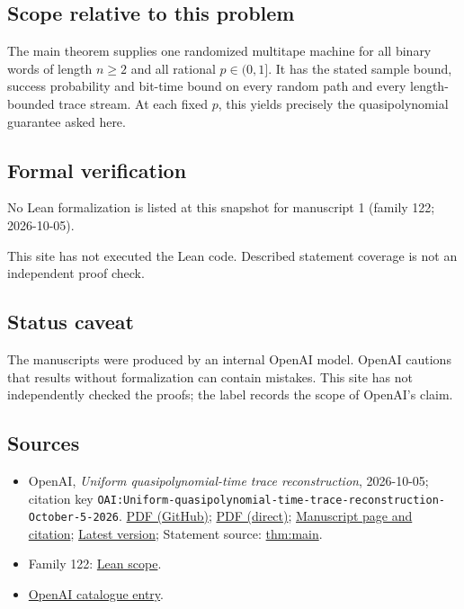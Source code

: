 \documentclass[11pt]{article}
\begin{document}
\subsection{Scope relative to this problem}
The main theorem supplies one randomized multitape machine for all binary words of length $n\ge2$ and all rational $p\in(0,1]$. It has the stated sample bound, success probability and bit-time bound on every random path and every length-bounded trace stream. At each fixed $p$, this yields precisely the quasipolynomial guarantee asked here.

\subsection{Formal verification}
No Lean formalization is listed at this snapshot for manuscript 1 (family 122; 2026-10-05).

This site has not executed the Lean code. Described statement coverage is not an independent proof check.

\subsection{Status caveat}
The manuscripts were produced by an internal OpenAI model. OpenAI cautions that results without formalization can contain mistakes. This site has not independently checked the proofs; the label records the scope of OpenAI's claim.

\subsection{Sources}
\begin{itemize}
\item OpenAI, \emph{Uniform quasipolynomial-time trace reconstruction}, 2026-10-05; citation key \texttt{OAI:Uniform-quasipolynomial-time-trace-reconstruction-October-5-2026}. \href{https://github.com/openai/math/blob/adc7f1241b42e322a6451854ab7e4b4c146bf78a/preprints/Uniform-quasipolynomial-time-trace-reconstruction-October-5-2026/uniform-trace-reconstruction.pdf}{PDF (GitHub)}; \href{https://github.com/openai/math/raw/adc7f1241b42e322a6451854ab7e4b4c146bf78a/preprints/Uniform-quasipolynomial-time-trace-reconstruction-October-5-2026/uniform-trace-reconstruction.pdf}{PDF (direct)}; \href{https://github.com/openai/math/blob/adc7f1241b42e322a6451854ab7e4b4c146bf78a/preprints/Uniform-quasipolynomial-time-trace-reconstruction-October-5-2026/README.md}{Manuscript page and citation}; \href{https://github.com/openai/math/blob/main/preprints/Uniform-quasipolynomial-time-trace-reconstruction-October-5-2026/uniform-trace-reconstruction.pdf}{Latest version}; Statement source: \href{https://github.com/openai/math/blob/adc7f1241b42e322a6451854ab7e4b4c146bf78a/preprints/Uniform-quasipolynomial-time-trace-reconstruction-October-5-2026/build/manuscript/main.tex\#L78}{thm:main}.
\item Family 122: \href{https://github.com/openai/math/blob/adc7f1241b42e322a6451854ab7e4b4c146bf78a/lean/docs/122.md}{Lean scope}.
\item \href{https://github.com/openai/math/blob/adc7f1241b42e322a6451854ab7e4b4c146bf78a/CONTENTS.md}{OpenAI catalogue entry}.
\end{itemize}
\end{document}
